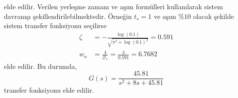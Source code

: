 elde edilir. Verilen yerleşme zamanı ve aşım formülleri kullanılarak sistem davranışı şekillendirilebilmektedir. Örneğin $t_s=1$ ve aşım $\%10$ olacak şekilde sistem transfer fonksiyonu seçilirse
\begin{equation} 
\begin{split} 
    \zeta&=-\frac{\log(0.1)}{\sqrt{\pi^2+\log(0.1)^2}}=0.591\\
    w_n&=\frac{4}{\zeta t_s}=\frac{4}{0.591}=6.7682
\end{split} 
\end{equation} 
elde edilir. Bu durumda,
\begin{equation} 
    G(s)=\frac{45.81}{s^2+8s+45.81}
\end{equation} 
transfer fonksiyonu elde edilir. 

